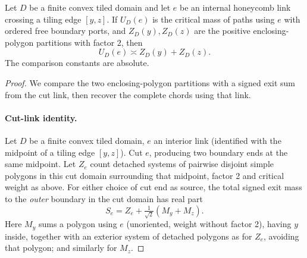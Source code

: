 \begin{proposition}\label{prop:occupancy}
Let $D$ be a finite convex tiled domain and let $e$ be an internal honeycomb link crossing a tiling edge $[y,z]$. If $U_D(e)$ is the critical mass of paths using $e$ with ordered free boundary ports, and $Z_D(y),Z_D(z)$ are the positive enclosing-polygon partitions with factor $2$, then
\[U_D(e)\asymp Z_D(y)+Z_D(z).\]
The comparison constants are absolute.\end{proposition}
\begin{proof}
We compare the two enclosing-polygon partitions with a signed exit sum from the cut link, then recover the complete chords using that link.

\paragraph{Cut-link identity.}
Let \(D\) be a finite convex tiled domain, \(e\) an interior link (identified with the midpoint of a tiling edge \([y,z]\)). Cut \(e\), producing two boundary ends at the same midpoint. Let \(Z_e\) count detached systems of pairwise disjoint simple polygons in this cut domain surrounding that midpoint, factor 2 and critical weight as above. For either choice of cut end as source, the total signed exit mass to the \emph{outer} boundary in the cut domain has real part
\[
 S_e= Z_e+\tfrac1{\sqrt2}(M_y+M_z).
\]
Here \(M_y\) sums a polygon using \(e\) (unoriented, weight without factor 2), having \(y\) inside, together with an exterior system of detached polygons as for \(Z_e\), avoiding that polygon; and similarly for \(M_z\).


\end{proof}
